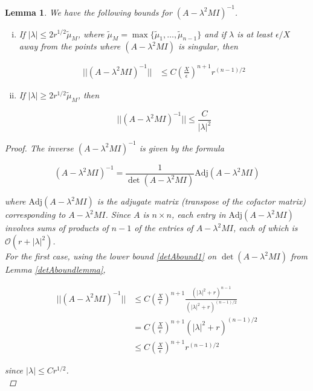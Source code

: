 \documentclass[12pt]{article}
\newtheorem{lemma}{Lemma}
\begin{document}
\begin{lemma}\label{Ainvboundlemma}
We have the following bounds for $(A - \lambda^2 M I)^{-1}$.
\begin{enumerate}[(i)]
\item If $|\lambda| \leq 2 r^{1/2} \tilde{\mu}_M$, where $\tilde{\mu}_M = \max\{\tilde{\mu}_1, \dots, \tilde{\mu}_{n-1}\}$ and if $\lambda$ is at least $\epsilon/X$ away from the points where $(A - \lambda^2 MI)$ is singular, then

\begin{align}\label{Ainvbound1}
||(A - \lambda^2 M I)^{-1}|| &\leq C \left(\frac{X}{\epsilon}\right)^{n+1}r^{(n-1)/2}
\end{align}

\item If $|\lambda| \geq 2 r^{1/2} \tilde{\mu}_M$, then

\begin{equation}\label{Ainvbound2}
||(A - \lambda^2 M I)^{-1}|| \leq \frac{C}{|\lambda|^2}
\end{equation}

\end{enumerate}
\begin{proof}
The inverse $(A - \lambda^2 M I)^{-1}$ is given by the formula

\[
(A - \lambda^2 M I)^{-1} = \frac{1}{\det(A - \lambda^2 M I)}\text{Adj}(A - \lambda^2 M I)
\]

where $\text{Adj}(A - \lambda^2 M I)$ is the adjugate matrix (transpose of the cofactor matrix) corresponding to $A - \lambda^2 M I$. Since $A$ is $n \times n$, each entry in $\text{Adj}(A - \lambda^2 M I)$ involves sums of products of $n-1$ of the entries of $A - \lambda^2 M I$, each of which is $\mathcal{O}(r + |\lambda|^2)$. \\

For the first case, using the lower bound \eqref{detAbound1} on $\det(A - \lambda^2 M I)$ from Lemma \ref{detAboundlemma}, 

\begin{align*}
||(A - \lambda^2 M I)^{-1}|| &\leq C \left(\frac{X}{\epsilon}\right)^{n+1} 
\frac{\left( |\lambda|^2 + r \right)^{n-1}}{\left( |\lambda|^2 + r \right)^{(n-1)/2}} \\
&= C \left(\frac{X}{\epsilon}\right)^{n+1}\left( |\lambda|^2 + r \right)^{(n-1)/2} \\
&\leq C \left(\frac{X}{\epsilon}\right)^{n+1} r^{(n-1)/2}
\end{align*}

since $|\lambda| \leq C r^{1/2}$.\\


\end{proof}
\end{lemma}
\end{document}
